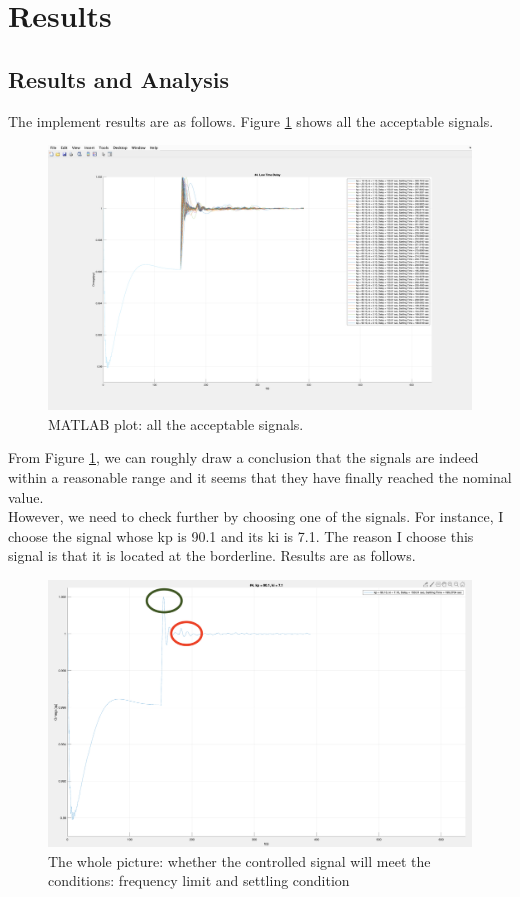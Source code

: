 \documentclass{report}
\begin{document}
\section{Results} %
\subsection{Results and Analysis} %
The implement results are as follows. Figure \textcolor{red}{\ref{4_4_1_result1}} shows all the acceptable signals.

\begin{figure}[htbp]
\centering
\includegraphics[width = .819\textwidth]{figure/4_4_1_result1.png}
\caption{MATLAB plot: all the acceptable signals.}
\label{4_4_1_result1}
\end{figure}

From Figure \textcolor{red}{\ref{4_4_1_result1}}, we can roughly draw a conclusion that the signals are indeed within a reasonable range and it seems that they have finally reached the nominal value. \\

However, we need to check further by choosing one of the signals. For instance, I choose the signal whose kp is 90.1 and its ki is 7.1. The reason I choose this signal is that it is located at the borderline. Results are as follows. \\

\begin{figure}[htbp]
\centering
\includegraphics[width = .819\textwidth]{figure/4_4_1_result2.png}
\caption{The whole picture: whether the controlled signal will meet the conditions: frequency limit and settling condition}
\label{4_4_1_result2}
\end{figure}
\end{document}
